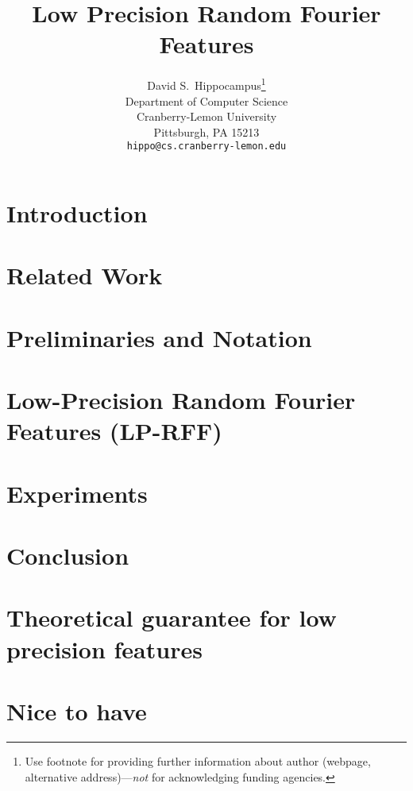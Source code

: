 \documentclass{article}
\title{Low Precision Random Fourier Features}
\author{
  David S.~Hippocampus\thanks{Use footnote for providing further
    information about author (webpage, alternative
    address)---\emph{not} for acknowledging funding agencies.} \\
  Department of Computer Science\\
  Cranberry-Lemon University\\
  Pittsburgh, PA 15213 \\
  \texttt{hippo@cs.cranberry-lemon.edu} \\
}
\begin{document}

\maketitle

\begin{abstract}

\end{abstract}

\section{Introduction}
\label{sec:intro}


\section{Related Work}
\label{sec:relwork}


\section{Preliminaries and Notation}
\label{sec:prelim}


%

\section{Low-Precision Random Fourier Features (LP-RFF)}
\label{sec:lprff}


\section{Experiments}
\label{sec:experiments}


\section{Conclusion}
\label{sec:conclusion}




%

%

\clearpage

\appendix

\section{Theoretical guarantee for low precision features}
\label{sec:lprff_theory_appendix}


\section{Nice to have}
\label{sec:nicetohave}

\end{document}
